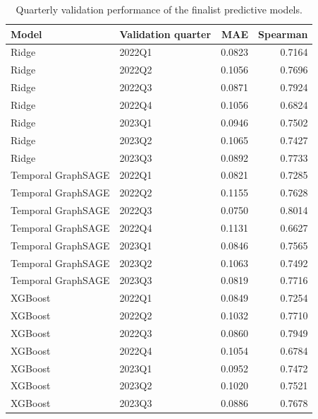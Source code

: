 \begin{table}
\caption{Quarterly validation performance of the finalist predictive models.}
\label{tab:selected-models-quarterly-validation-performance}
\begin{tabular}{llrr}
\toprule
Model & Validation quarter & MAE & Spearman \\
\midrule
Ridge & 2022Q1 & 0.0823 & 0.7164 \\
Ridge & 2022Q2 & 0.1056 & 0.7696 \\
Ridge & 2022Q3 & 0.0871 & 0.7924 \\
Ridge & 2022Q4 & 0.1056 & 0.6824 \\
Ridge & 2023Q1 & 0.0946 & 0.7502 \\
Ridge & 2023Q2 & 0.1065 & 0.7427 \\
Ridge & 2023Q3 & 0.0892 & 0.7733 \\
Temporal GraphSAGE & 2022Q1 & 0.0821 & 0.7285 \\
Temporal GraphSAGE & 2022Q2 & 0.1155 & 0.7628 \\
Temporal GraphSAGE & 2022Q3 & 0.0750 & 0.8014 \\
Temporal GraphSAGE & 2022Q4 & 0.1131 & 0.6627 \\
Temporal GraphSAGE & 2023Q1 & 0.0846 & 0.7565 \\
Temporal GraphSAGE & 2023Q2 & 0.1063 & 0.7492 \\
Temporal GraphSAGE & 2023Q3 & 0.0819 & 0.7716 \\
XGBoost & 2022Q1 & 0.0849 & 0.7254 \\
XGBoost & 2022Q2 & 0.1032 & 0.7710 \\
XGBoost & 2022Q3 & 0.0860 & 0.7949 \\
XGBoost & 2022Q4 & 0.1054 & 0.6784 \\
XGBoost & 2023Q1 & 0.0952 & 0.7472 \\
XGBoost & 2023Q2 & 0.1020 & 0.7521 \\
XGBoost & 2023Q3 & 0.0886 & 0.7678 \\
\bottomrule
\end{tabular}
\end{table}
